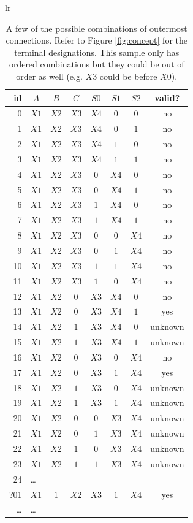 \documentclass[12pt]{article}
\begin{document}
\begin{table}[tbp]
\begin{center}
\begin{tabular}{lr}
\begin{tabular}[t]{r|cccccc|c}
id&$A$&$B$&$C$&$S0$&$S1$&$S2$&valid?\\
\hline

0 &$X1$&$X2$&$X3$&$X4$&$0$&$0$&no\\
1 &$X1$&$X2$&$X3$&$X4$&$0$&$1$&no\\
2 &$X1$&$X2$&$X3$&$X4$&$1$&$0$&no\\
3 &$X1$&$X2$&$X3$&$X4$&$1$&$1$&no\\

4 &$X1$&$X2$&$X3$&$0$&$X4$&$0$&no\\
5 &$X1$&$X2$&$X3$&$0$&$X4$&$1$&no\\
6 &$X1$&$X2$&$X3$&$1$&$X4$&$0$&no\\
7 &$X1$&$X2$&$X3$&$1$&$X4$&$1$&no\\

8 &$X1$&$X2$&$X3$&$0$&$0$&$X4$&no\\
9 &$X1$&$X2$&$X3$&$0$&$1$&$X4$&no\\
10 &$X1$&$X2$&$X3$&$1$&$1$&$X4$&no\\
11 &$X1$&$X2$&$X3$&$1$&$0$&$X4$&no\\

12 &$X1$&$X2$&$0$&$X3$&$X4$&$0$&no\\
13 &$X1$&$X2$&$0$&$X3$&$X4$&$1$&yes\\
14 &$X1$&$X2$&$1$&$X3$&$X4$&$0$&unknown\\
15 &$X1$&$X2$&$1$&$X3$&$X4$&$1$&unknown\\

16 &$X1$&$X2$&$0$&$X3$&$0$&$X4$&no\\
17 &$X1$&$X2$&$0$&$X3$&$1$&$X4$&yes\\
18 &$X1$&$X2$&$1$&$X3$&$0$&$X4$&unknown\\
19 &$X1$&$X2$&$1$&$X3$&$1$&$X4$&unknown\\

20 &$X1$&$X2$&$0$&$0$&$X3$&$X4$&unknown\\
21 &$X1$&$X2$&$0$&$1$&$X3$&$X4$&unknown\\
22 &$X1$&$X2$&$1$&$0$&$X3$&$X4$&unknown\\
23 &$X1$&$X2$&$1$&$1$&$X3$&$X4$&unknown\\
24 & \multicolumn{6}{l|}{\ldots} & \\
?01 &$X1$&$1$&$X2$&$X3$&$1$&$X4$&yes\\
\ldots & \multicolumn{6}{l|}{\ldots} & \\
\end{tabular}
\end{tabular}
\end{center}
\caption{A few of the possible combinations of outermost connections.
Refer to Figure \ref{fig:concept} for the terminal designations.
This sample only has ordered combinations but they could be out of
order as well (e.g. $X3$ could be before $X0$).
}
\label{tbl:outcon}
\end{table}
\end{document}
